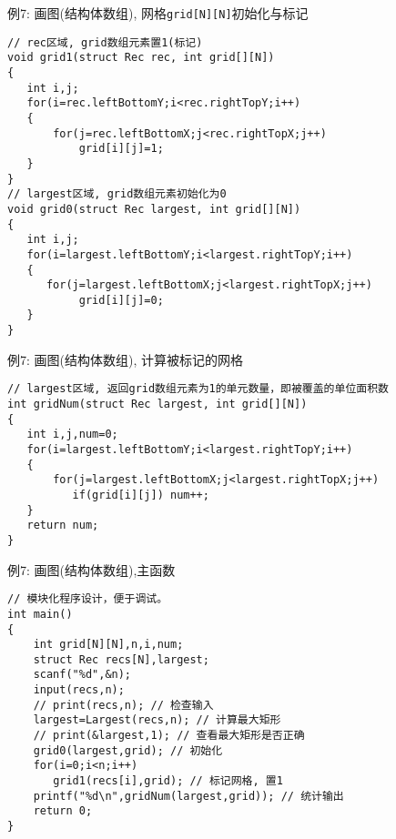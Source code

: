 \begin{frame}{例7: 画图(结构体数组), 网格\lstinline$grid[N][N]$初始化与标记}
\vspace{-0.3cm}
\begin{lstlisting}
// rec区域, grid数组元素置1(标记) 
void grid1(struct Rec rec, int grid[][N])
{
   int i,j;
   for(i=rec.leftBottomY;i<rec.rightTopY;i++)
   {
       for(j=rec.leftBottomX;j<rec.rightTopX;j++)
           grid[i][j]=1;
   } 
}
// largest区域, grid数组元素初始化为0 
void grid0(struct Rec largest, int grid[][N])
{
   int i,j;
   for(i=largest.leftBottomY;i<largest.rightTopY;i++)
   {
      for(j=largest.leftBottomX;j<largest.rightTopX;j++)
           grid[i][j]=0;
   } 
}
\end{lstlisting}
\end{frame}

\begin{frame}{例7: 画图(结构体数组), 计算被标记的网格}
\begin{lstlisting}
// largest区域, 返回grid数组元素为1的单元数量，即被覆盖的单位面积数 
int gridNum(struct Rec largest, int grid[][N])
{
   int i,j,num=0;
   for(i=largest.leftBottomY;i<largest.rightTopY;i++)
   {
       for(j=largest.leftBottomX;j<largest.rightTopX;j++)
          if(grid[i][j]) num++;
   } 
   return num;
}
\end{lstlisting}
\end{frame}

\begin{frame}{例7: 画图(结构体数组),主函数}
\vspace{-0.4cm}
\begin{lstlisting}
// 模块化程序设计，便于调试。
int main()
{
    int grid[N][N],n,i,num;
    struct Rec recs[N],largest;
    scanf("%d",&n);
    input(recs,n);
    // print(recs,n); // 检查输入 
    largest=Largest(recs,n); // 计算最大矩形 
    // print(&largest,1); // 查看最大矩形是否正确 
    grid0(largest,grid); // 初始化 
    for(i=0;i<n;i++)
       grid1(recs[i],grid); // 标记网格, 置1 
    printf("%d\n",gridNum(largest,grid)); // 统计输出 
    return 0;
}
\end{lstlisting}
\end{frame}

